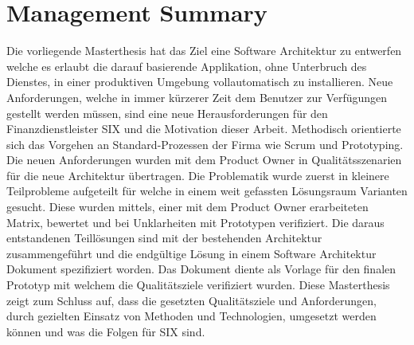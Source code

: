 \chapter{Management Summary}

Die vorliegende Masterthesis hat das Ziel eine Software Architektur zu entwerfen welche es erlaubt die darauf basierende Applikation, ohne Unterbruch des Dienstes, in einer produktiven Umgebung vollautomatisch zu installieren.\newline\newline
Neue Anforderungen, welche in immer kürzerer Zeit dem Benutzer zur Verfügungen gestellt werden müssen, sind eine neue Herausforderungen für den Finanzdienstleister SIX und die Motivation dieser Arbeit.\newline\newline
Methodisch orientierte sich das Vorgehen an Standard-Prozessen der Firma wie Scrum und Prototyping. Die neuen Anforderungen wurden mit dem Product Owner in Qualitätsszenarien für die neue Architektur übertragen. Die Problematik wurde zuerst in kleinere Teilprobleme aufgeteilt  für welche in einem weit gefassten Lösungsraum Varianten gesucht. Diese wurden mittels, einer mit dem Product Owner erarbeiteten Matrix, bewertet und bei Unklarheiten mit Prototypen verifiziert. Die daraus entstandenen Teillösungen sind mit der bestehenden Architektur zusammengeführt und die endgültige Lösung in einem Software Architektur Dokument spezifiziert worden. Das Dokument diente als Vorlage für den finalen Prototyp mit welchem die Qualitätsziele verifiziert wurden.\newline\newline
Diese Masterthesis zeigt zum Schluss auf, dass die gesetzten Qualitätsziele und Anforderungen, durch gezielten Einsatz von Methoden und Technologien, umgesetzt werden können und was die Folgen für SIX sind.